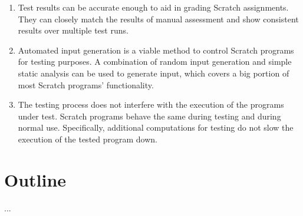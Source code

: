 \begin{enumerate}[(1)]
    \item Test results can be accurate enough to aid in grading Scratch assignments.
        They can closely match the results of manual assessment and show consistent results over multiple test runs.
    \item Automated input generation is a viable method to control Scratch programs for testing purposes.
        A combination of random input generation and simple static analysis can be used to generate input, which covers a big portion of most Scratch programs' functionality.
    \item The testing process does not interfere with the execution of the programs under test.
        Scratch programs behave the same during testing and during normal use.
        Specifically, additional computations for testing do not slow the execution of the tested program down.
\end{enumerate}

\section{Outline}
...

%
